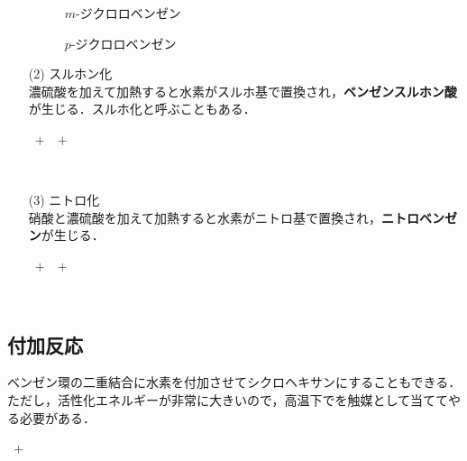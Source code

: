\documentclass[a4paper,12pt]{ltjsreport}
\begin{document}
\begin{itemize}
\begin{minipage}{0.35\linewidth}
\begin{figure}[H]
    \centering
\caption{$m$-ジクロロベンゼン} 
\end{figure}
\end{minipage}
\begin{minipage}{0.35\linewidth}
\begin{figure}[H]
    \centering
\caption{$p$-ジクロロベンゼン} 
\end{figure}
\end{minipage}
\item[(2)]スルホン化\\
濃硫酸を加えて加熱すると水素がスルホ基で置換され，{\color{red}\textbf{ベンゼンスルホン酸}}が生じる．スルホ化と呼ぶこともある．\\[5pt]
    \centerline{~$+$~~$+$~}\\[5pt]
    \item[(3)]ニトロ化\\
硝酸と濃硫酸を加えて加熱すると水素がニトロ基で置換され，{\color{red}\textbf{ニトロベンゼン}}が生じる．\\[5pt]
    \centerline{~$+$~~$+$~}\\[5pt]
\end{itemize}
\subsection{付加反応}
ベンゼン環の二重結合に水素を付加させてシクロヘキサンにすることもできる．ただし，活性化エネルギーが非常に大きいので，高温下でを触媒として当ててやる必要がある．\\[5pt]
  \centerline{~$+$~}\\[5pt]
\end{document}
